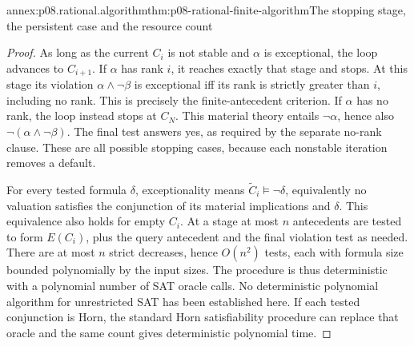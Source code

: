 \begin{annexitem}{annex:p08.rational.algorithm}{thm:p08-rational-finite-algorithm}{The stopping stage, the persistent case and the resource count}
\begin{proof}
As long as the current \(C_i\) is not stable and \(\alpha\)
is exceptional, the loop advances to \(C_{i+1}\).
If \(\alpha\) has rank \(i\), it reaches exactly that stage
and stops. At this stage its violation \(\alpha\wedge\neg\beta\)
is exceptional iff its rank is strictly greater than \(i\),
including no rank. This is precisely the finite-antecedent criterion.
If \(\alpha\) has no rank, the loop instead stops at \(C_N\).
This material theory entails \(\neg\alpha\), hence also
\(\neg(\alpha\wedge\neg\beta)\). The final test answers yes,
as required by the separate no-rank clause. These are all possible
stopping cases, because each nonstable iteration removes a default.

For every tested formula \(\delta\), exceptionality means
\(\widetilde C_i\models\neg\delta\), equivalently no valuation
satisfies the conjunction of its material implications and \(\delta\).
This equivalence also holds for empty \(C_i\).
At a stage at most \(n\) antecedents are tested to form \(E(C_i)\),
plus the query antecedent and the final violation test as needed.
There are at most \(n\) strict decreases, hence \(O(n^2)\) tests,
each with formula size bounded polynomially by the input sizes.
The procedure is thus deterministic with a polynomial number of SAT
oracle calls. No deterministic polynomial algorithm for unrestricted
SAT has been established here. If each tested conjunction is Horn,
the standard Horn satisfiability procedure can replace that oracle and
the same count gives deterministic polynomial time.
\end{proof}
\end{annexitem}

